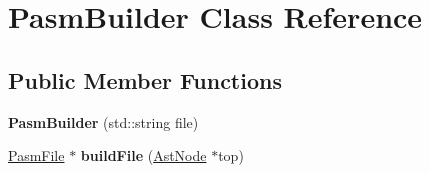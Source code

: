 \hypertarget{classPasmBuilder}{}\section{Pasm\+Builder Class Reference}
\label{classPasmBuilder}
\subsection*{Public Member Functions}
\begin{DoxyCompactItemize}
\item 
\mbox{\label{classPasmBuilder_a4f5c79c4b0847c36f5b0322ee42cf778}} 
{\bfseries Pasm\+Builder} (std\+::string file)
\item 
\mbox{\label{classPasmBuilder_abf8aa476dfa0fb6e8b0218747872f5c5}} 
\hyperlink{classPASM_1_1PasmFile}{Pasm\+File} $\ast$ {\bfseries build\+File} (\hyperlink{classAstNode}{Ast\+Node} $\ast$top)
\end{DoxyCompactItemize}
